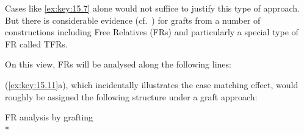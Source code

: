 \documentclass[output=paper]{langsci/langscibook}
\begin{document}
\begin{refcontext}
Cases like \eqref{ex:key:15.7} alone would not suffice to justify this type of approach. But
there is considerable evidence
(cf.~\citealt{VanRiemsdijk2001,VanRiemsdijk2006a,VanRiemsdijk2006b,VanRiemsdijk2006c,VanRiemsdijk2010})
for grafts from a number of constructions including Free Relatives (\glspl{FR})
and particularly a special type of FR called \glspl{TFR}.

On this view, \glspl{FR} will be analysed along the following
lines:

\ea\label{ex:key:15.11}
    \z
\z
(\ref{ex:key:15.11}a), which incidentally illustrates the case matching effect, would roughly
be assigned the following structure under a graft approach:


\ea\label{ex:key:15.12} \gls{FR} analysis by grafting\\*
\end{refcontext}
\end{document}
